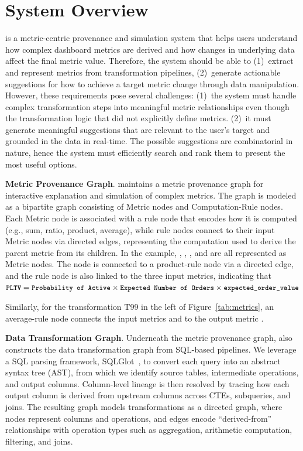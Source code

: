 
\section{System Overview}

\clue is a metric-centric provenance and simulation system that helps users
understand how complex dashboard metrics are derived and how changes in
underlying data affect the final metric value. Therefore, the system should be
able to (1)~extract and represent metrics from transformation pipelines,
(2)~generate actionable suggestions for how to achieve a target metric change
through data manipulation. However, these requirements pose several challenges:
(1)~the system must handle complex transformation steps into meaningful metric
relationships even though the transformation logic that did not explicitly
define metrics. (2)~it must generate meaningful suggestions that are relevant to
the user's target and grounded in the data in real-time. The possible
suggestions are combinatorial in nature, hence the system must efficiently
search and rank them to present the most useful options.

\noindent \textbf{Metric Provenance Graph}. \clue maintains a metric provenance
graph for interactive explanation and simulation of complex metrics. The graph
is modeled as a bipartite graph consisting of Metric nodes and Computation-Rule
nodes. Each Metric node is associated with a rule node that encodes how it is
computed (e.g., sum, ratio, product, average), while rule nodes connect to their
input Metric nodes via directed edges, representing the computation used to
derive the parent metric from its children. In the  example,
, , , and  are all represented as Metric
nodes. The  node is connected to a product-rule node via a directed
edge,  and the rule node is also linked to the three input metrics, indicating
that ${\small\texttt{{\small PLTV}}} = {\small\texttt{{\small Probability of Active}}}  \times {\small\texttt{{\small Expected
Number of Orders}}} \times {\small\texttt{{\small expected\_order\_value}}} $

Similarly, for the transformation T99 in the left of Figure~\ref{tab:metrics},
an average-rule node connects the input metrics  and
 to the output metric . 

\noindent \textbf{Data Transformation Graph}. Underneath the metric provenance
graph, \clue also constructs the data transformation graph from SQL-based
pipelines. We leverage a SQL parsing framework, SQLGlot~\cite{sqlglot}, to
convert each query into an abstract syntax tree (AST), from which we identify
source tables, intermediate operations, and output columns. Column-level lineage
is then resolved by tracing how each output column is derived from upstream
columns across CTEs, subqueries, and joins. The resulting graph models
transformations as a directed graph, where nodes represent columns and
operations, and edges encode ``derived-from'' relationships with operation types
such as aggregation, arithmetic computation, filtering, and joins. 

